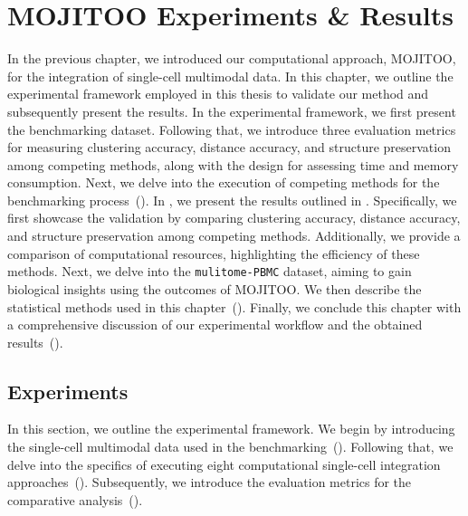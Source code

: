 %
\chapter{MOJITOO Experiments \& Results }
\label{chapter:MOJITOO_bench}

\graphicspath{{chapter5/figs}}
In the previous chapter, we introduced our computational approach, MOJITOO, for the integration of single-cell multimodal data. In this chapter, we outline the experimental framework employed in this thesis to validate our method and subsequently present the results. In the experimental framework, we first present the benchmarking dataset. Following that, we introduce three evaluation metrics for measuring clustering accuracy, distance accuracy, and structure preservation among competing methods, along with the design for assessing time and memory consumption. Next, we delve into the execution of competing methods for the benchmarking process~(). In , we present the results outlined in . Specifically, we first showcase the validation by comparing clustering accuracy, distance accuracy, and structure preservation among competing methods. Additionally, we provide a comparison of computational resources, highlighting the efficiency of these methods. Next, we delve into the \texttt{mulitome-PBMC} dataset, aiming to gain biological insights using the outcomes of MOJITOO. We then describe the statistical methods used in this chapter~(). Finally, we conclude this chapter with a comprehensive discussion of our experimental workflow and the obtained results~().


\section{Experiments}
\label{MOJITOO:exp}
In this section, we outline the experimental framework. We begin by introducing the single-cell multimodal data used in the benchmarking~(). Following that, we delve into the specifics of executing eight computational single-cell integration approaches~(). Subsequently, we introduce the evaluation metrics for the comparative analysis~().

